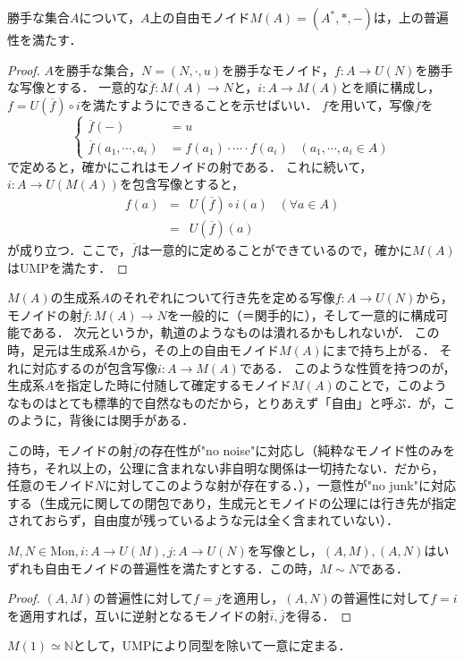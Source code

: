 \documentclass[uplatex, dvipdfmx]{jsarticle}
\begin{document}
\begin{proposition}
    勝手な集合$A$について，$A$上の自由モノイド$M(A)=(A^*,*,-)$は，上の普遍性を満たす．
\end{proposition}
\begin{proof}
    $A$を勝手な集合，$N=(N,\cdot,u)$を勝手なモノイド，$f:A\to U(N)$を勝手な写像とする．
    一意的な$\overline{f}:M(A)\to N$と，$i:A\to M(A)$とを順に構成し，$f=U(\overline{f})\circ i$を満たすようにできることを示せばいい．
    $f$を用いて，写像$\overline{f}$を
    $$\begin{cases}
        \overline{f}(-) &= u \\
        \overline{f}(a_1,\cdots,a_i) &= f(a_1)\cdot\cdots\cdot f(a_i)\;\;\; (a_1,\cdots,a_i\in A)
    \end{cases}$$
    で定めると，確かにこれはモノイドの射である．
    これに続いて，$i:A\to U(M(A))$を包含写像とすると，
    \begin{eqnarray*}
        f(a)&=& U(\overline{f})\circ i(a)\;\;\; (\forall a\in A) \\
        &=& U(\overline{f})(a)
    \end{eqnarray*}
    が成り立つ．ここで，$\overline{f}$は一意的に定めることができているので，確かに$M(A)$はUMPを満たす．
\end{proof}
\begin{remark*}[自由モノイドの普遍性として妥当な直観的理由]
    $M(A)$の生成系$A$のそれぞれについて行き先を定める写像$f:A\to U(N)$から，モノイドの射$\overline{f}:M(A)\to N$を一般的に（＝関手的に），そして一意的に構成可能である．
    次元というか，軌道のようなものは潰れるかもしれないが．
    この時，足元は生成系$A$から，その上の自由モノイド$M(A)$にまで持ち上がる．
    それに対応するのが包含写像$i:A\to M(A)$である．
    このような性質を持つのが，生成系$A$を指定した時に付随して確定するモノイド$M(A)$のことで，このようなものはとても標準的で自然なものだから，とりあえず「自由」と呼ぶ．が，このように，背後には関手がある．

    この時，モノイドの射$\overline{f}$の存在性が"no noise"に対応し（純粋なモノイド性のみを持ち，それ以上の，公理に含まれない非自明な関係は一切持たない．だから，
    任意のモノイド$N$に対してこのような射が存在する．），一意性が"no junk"に対応する（生成元に関しての閉包であり，生成元とモノイドの公理には行き先が指定されておらず，自由度が残っているような元は全く含まれていない）．
\end{remark*}

\begin{proposition}[UMPが対象を同型を除いて一意に定める]
    $M,N\in\mathrm{Mon}, i:A\to U(M), j:A\to U(N)$を写像とし，$(A,M),(A,N)$はいずれも自由モノイドの普遍性を満たすとする．この時，$M\sim N$である．
\end{proposition}
\begin{proof}
    $(A,M)$の普遍性に対して$f=j$を適用し，$(A,N)$の普遍性に対して$f=i$を適用すれば，互いに逆射となるモノイドの射$\overline{i}, \overline{j}$を得る．
\end{proof}
\begin{example*}
    $M(1)\simeq\mathbb{N}$として，UMPにより同型を除いて一意に定まる．
\end{example*}
\end{document}
